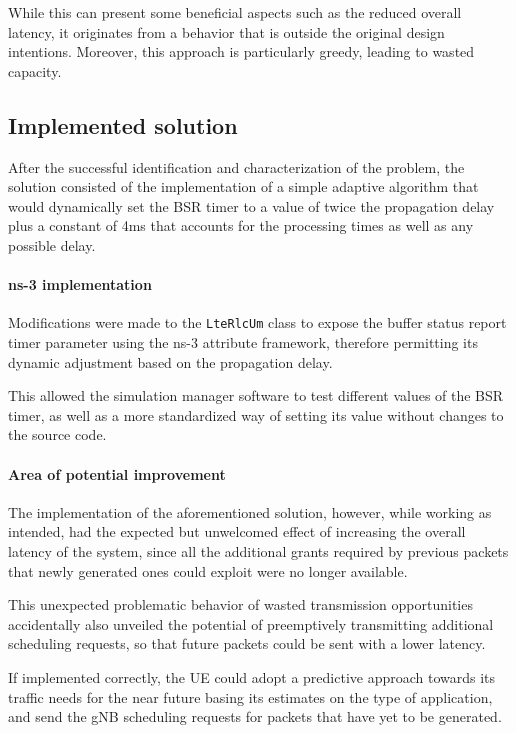 While this can present some beneficial aspects such as the reduced overall latency, it originates from a behavior that is outside the original design intentions. Moreover, this approach is particularly greedy, leading to wasted capacity.

\subsection{Implemented solution}

After the successful identification and characterization of the problem, the  solution consisted of the implementation of a simple adaptive algorithm that would dynamically set the \ac{BSR} timer to a value of twice the propagation delay plus a constant of 4ms that accounts for the processing times as well as any possible delay.

\paragraph{ns-3 implementation}
Modifications were made to the \texttt{LteRlcUm} class to expose the buffer status report timer parameter using the ns-3 attribute framework, therefore permitting its dynamic adjustment based on the propagation delay. 

This allowed the simulation manager software to test different values of the \ac{BSR} timer, as well as a more standardized way of setting its value without changes to the source code.

\paragraph{Area of potential improvement}
The implementation of the aforementioned solution, however, while working as intended, had the expected but unwelcomed effect of increasing the overall latency of the system, since all the additional grants required by previous packets that newly generated ones could exploit were no longer available.

This unexpected problematic behavior of wasted transmission opportunities accidentally also unveiled the potential of preemptively transmitting additional scheduling requests, so that future packets could be sent with a lower latency.

If implemented correctly, the \ac{UE} could adopt a predictive approach towards its traffic needs for the near future basing its estimates on the type of application, and send the \ac{gNB} scheduling requests for packets that have yet to be generated.

